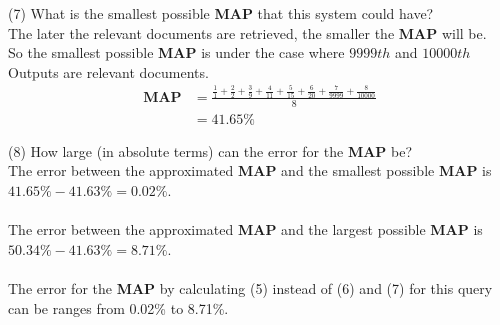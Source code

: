 \documentclass[12pt, letterpaper, twoside]{article}
\begin{document}
\begin{enumerate}
        (7) What is the smallest possible \textbf{MAP} that this system could have?\\
        The later the relevant documents are retrieved, the smaller the \textbf{MAP} will be.\\
        So the smallest possible \textbf{MAP} is under the case where $9999th$ and $10000th$ Outputs are relevant documents.\\
        \begin{equation}
        \begin{split}
            \textbf{MAP} & = \frac{\frac{1}{1} + \frac{2}{2} + \frac{3}{9} + \frac{4}{11} + \frac{5}{15} + \frac{6}{20} + \frac{7}{9999} + \frac{8}{10000}}{8}\\
            & = 41.65\%
        \end{split}
        \end{equation}

        (8) How large (in absolute terms) can the error for the \textbf{MAP} be?\\
        The error between the approximated \textbf{MAP} and the smallest possible \textbf{MAP} is $41.65\% - 41.63\% = 0.02\%$.\\\\
        The error between the approximated \textbf{MAP} and the largest possible \textbf{MAP} is $50.34\% - 41.63\% = 8.71\%$.\\\\
        The error for the \textbf{MAP} by calculating (5) instead of (6) and (7) for this query can be ranges from 0.02\% to 8.71\%.


\end{enumerate}
\end{document}
